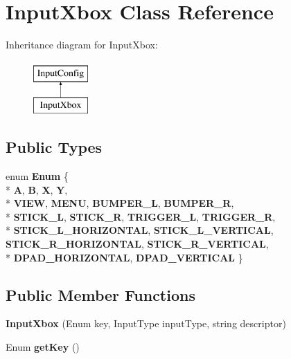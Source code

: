 \hypertarget{class_input_xbox}{\section{Input\-Xbox Class Reference}
\label{class_input_xbox}
}
Inheritance diagram for Input\-Xbox\-:\begin{figure}[H]
\begin{center}
\leavevmode
\includegraphics[height=2.000000cm]{class_input_xbox}
\end{center}
\end{figure}
\subsection*{Public Types}
\begin{DoxyCompactItemize}
\item 
enum {\bfseries Enum} \{ \\*
{\bfseries A}, 
{\bfseries B}, 
{\bfseries X}, 
{\bfseries Y}, 
\\*
{\bfseries V\-I\-E\-W}, 
{\bfseries M\-E\-N\-U}, 
{\bfseries B\-U\-M\-P\-E\-R\-\_\-\-L}, 
{\bfseries B\-U\-M\-P\-E\-R\-\_\-\-R}, 
\\*
{\bfseries S\-T\-I\-C\-K\-\_\-\-L}, 
{\bfseries S\-T\-I\-C\-K\-\_\-\-R}, 
{\bfseries T\-R\-I\-G\-G\-E\-R\-\_\-\-L}, 
{\bfseries T\-R\-I\-G\-G\-E\-R\-\_\-\-R}, 
\\*
{\bfseries S\-T\-I\-C\-K\-\_\-\-L\-\_\-\-H\-O\-R\-I\-Z\-O\-N\-T\-A\-L}, 
{\bfseries S\-T\-I\-C\-K\-\_\-\-L\-\_\-\-V\-E\-R\-T\-I\-C\-A\-L}, 
{\bfseries S\-T\-I\-C\-K\-\_\-\-R\-\_\-\-H\-O\-R\-I\-Z\-O\-N\-T\-A\-L}, 
{\bfseries S\-T\-I\-C\-K\-\_\-\-R\-\_\-\-V\-E\-R\-T\-I\-C\-A\-L}, 
\\*
{\bfseries D\-P\-A\-D\-\_\-\-H\-O\-R\-I\-Z\-O\-N\-T\-A\-L}, 
{\bfseries D\-P\-A\-D\-\_\-\-V\-E\-R\-T\-I\-C\-A\-L}
 \}
\end{DoxyCompactItemize}
\subsection*{Public Member Functions}
\begin{DoxyCompactItemize}
\item 
\hypertarget{class_input_xbox_a71539acaba43563936ec920d4e680e31}{{\bfseries Input\-Xbox} (Enum key, Input\-Type input\-Type, string descriptor)}\label{class_input_xbox_a71539acaba43563936ec920d4e680e31}

\item 
\hypertarget{class_input_xbox_a5297129b5e934105bea74ed78fcee102}{Enum {\bfseries get\-Key} ()}\label{class_input_xbox_a5297129b5e934105bea74ed78fcee102}

\end{DoxyCompactItemize}
